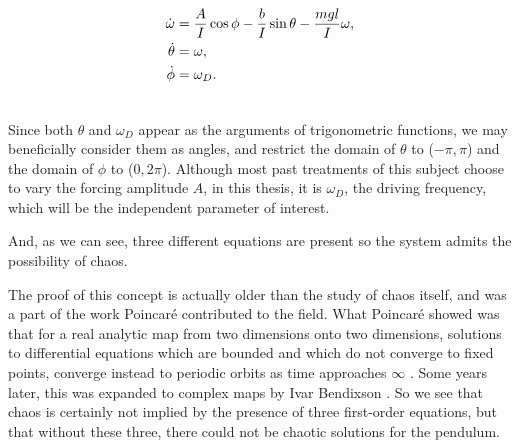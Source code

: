 \documentclass[12pt,twoside]{reedthesis}
\begin{document}





\begin{align}
\label{first_order_eqs}
\dot{\omega} & = \frac{A}{I}\cos{\phi}-\frac{b}{I} \sin{\theta} - \frac{mgl}{I}\omega, \label{a}\\
\dot{\theta} & =\omega, \label{b}\\
\dot{\phi} & =\omega_D. \label{c}\\
& \notag
\end{align}


Since both $\theta$ and $\omega_D$ appear as the arguments of trigonometric functions, we may beneficially consider them as angles, and restrict the domain of $\theta$ to ($-\pi, \pi$) and the domain of $\phi$ to ($0, 2\pi$).  Although most past treatments of this subject choose to vary the forcing amplitude $A$, in this thesis, it is $\omega_D$, the driving frequency, which will be the independent parameter of interest. 

And, as we can see, three different equations are present so the system admits the possibility of chaos. 

The proof of this concept is actually older than the study of chaos itself, and was a part of the work Poincar\'{e} contributed to the field.  What Poincar\'{e} showed was that for a real analytic map from two dimensions onto two dimensions, solutions to differential equations which are bounded and which do not converge to fixed points, converge instead to periodic orbits as time approaches $\infty$  \cite{perko1991}.  Some years later, this was expanded to complex maps by Ivar Bendixson \cite{bendixson1901}.  So we see that chaos is certainly not implied by the presence of three first-order equations, but that without these three, there could not be chaotic solutions for the pendulum.
\end{document}
